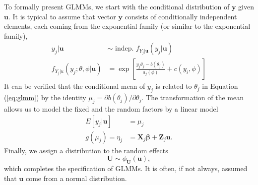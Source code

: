 To formally present GLMMs, we start with the conditional distribution of $\bm y$ given $\bm u$. It
is typical to assume that vector $\bm y$ consists of conditionally independent elements, each coming
from the exponential family (or similar to the exponential family), 
\begin{equation}\label{eq:glmm}
\begin{split}
y_j|\bm u & \sim \text{~indep.~} f_{Y_j |\bm u} (y_j|\bm u) \\
f_{Y_j|u}(y_j; \theta, \phi|\bm u) &= \exp \left[ \frac{y_j\theta_j	 -b(\theta_j)}{a_j(\phi)}
+ c(y_i, \phi)\right]
\end{split}
\end{equation}	
It can be verified that the conditional mean of $y_j$ is related to $\theta_j$ in Equation
(\ref{eq:glmm}) by the identity $\mu_j = \partial b(\theta_j)/\partial \theta_j$. The transformation
of the mean allows us to model the fixed and the random factors by a linear model
\begin{equation}\label{eq:glmm2}
\begin{split}
E[y_j|\bm u] &= \mu_j\\
g(\mu_j) = \eta_j &= \bm X_j\bm \beta + \bm Z_j\bm u.
\end{split}
\end{equation}
Finally, we assign a distribution to the random effects
\begin{equation}
\bm U \sim \phi_{\bm U}(\bm u),
\end{equation}
which completes the specification of GLMMs. It is often, if not always, assumed that $\bm u$ come
from a normal distribution.

